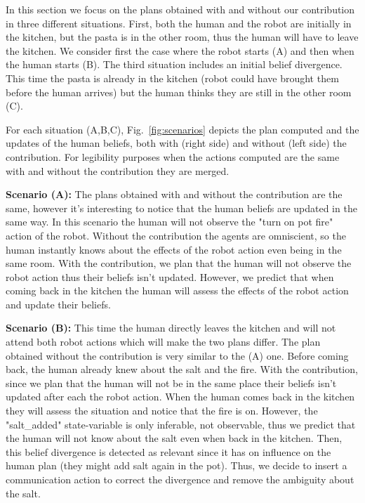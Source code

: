 \documentclass[letterpaper]{article} %
\begin{document}
In this section we focus on the plans obtained with and without our contribution in three different situations. First, both the human and the robot are initially in the kitchen, but the pasta is in the other room, thus the human will have to leave the kitchen. We consider first the case where the robot starts (A) and then when the human starts (B). The third situation includes an initial belief divergence. This time the pasta is already in the kitchen (robot could have brought them before the human arrives) but the human thinks they are still in the other room (C).  

For each situation (A,B,C), Fig.~\ref{fig:scenarios} depicts the plan computed and the updates of the human beliefs, both with (right side) and without (left side) the contribution. For legibility purposes when the actions computed are the same with and without the contribution they are merged.

\textbf{Scenario (A):} The plans obtained with and without the contribution are the same, however it's interesting to notice that the human beliefs are updated in the same way. In this scenario the human will not observe the "turn on pot fire" action of the robot. Without the contribution the agents are omniscient, so the human instantly knows about the effects of the robot action even being in the same room. With the contribution, we plan that the human will not observe the robot action thus their beliefs isn't updated. However, we predict that when coming back in the kitchen the human will assess the effects of the robot action and update their beliefs.

\textbf{Scenario (B):} This time the human directly leaves the kitchen and will not attend both robot actions which will make the two plans differ. The plan obtained without the contribution is very similar to the (A) one. Before coming back, the human already knew about the salt and the fire. With the contribution, since we plan that the human will not be in the same place their beliefs isn't updated after each the robot action. When the human comes back in the kitchen they will assess the situation and notice that the fire is on. However, the "salt\_added" state-variable is only inferable, not observable, thus we predict that the human will not know about the salt even when back in the kitchen. Then, this belief divergence is detected as relevant since it has on influence on the human plan (they might add salt again in the pot). Thus, we decide to insert a communication action to correct the divergence and remove the ambiguity about the salt.
\end{document}
